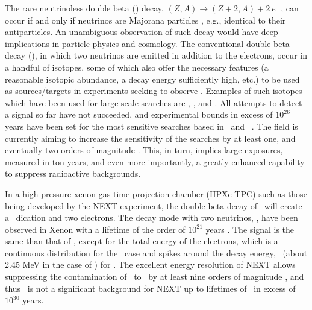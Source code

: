 \documentclass[aps,prl,reprint,longbibliography,superscriptaddress, english]{revtex4-1}
\begin{document}
The rare neutrinoless double beta  (\bbonu) decay, $(Z,A) \rightarrow (Z+2,A) + 2\ e^{-}$, can occur if and only if neutrinos are Majorana particles \cite{Majorana:1937}, e.g., identical to their antiparticles. An unambiguous observation of such decay would have deep implications in particle physics and cosmology\cite{Sakharov1967,Fukugita:1986hr, GellMann:1980vs, Yanagida:1979as, Mohapatra:1979ia}. 
The conventional double beta decay (\bbtnu), in which two neutrinos are emitted in addition to the electrons, occur in a handful of isotopes, some of which also offer the necessary features (a reasonable isotopic abundance, a decay energy sufficiently high, etc.) to be used as sources/targets in experiments seeking to observe \bbonu. Examples of such isotopes which have been used for large-scale searches are \GE, \TE, and \XE. All attempts to detect a signal so far have not succeeded, and experimental bounds in excess of $10^{26}$ years have been set for the most sensitive searches based in \XE\ and \GE\ \cite{Gando:2016ji, Agostini:2018tnm}.
The field is currently aiming to increase the sensitivity of the searches by at least one, and eventually two orders of magnitude \cite{Gomez-Cadenas:2019sfa}. This, in turn, implies large exposures, measured in ton-years, and even more importantly, a greatly enhanced capability to suppress radioactive backgrounds. 

In a high pressure xenon gas time projection chamber (HPXe-TPC) such as those being developed by the NEXT experiment, the double beta decay of \XE\ will create a \Bapp\ dication and two electrons.
%
The decay mode with two neutrinos, \bbtnu, have been observed in Xenon with a lifetime of the order of $10^{21}$ years \cite{Ackerman:2011gz}. The  signal is the same than that of \bbonu, except for the total energy of the electrons, which is a continuous distribution for the \bbtnu\ case and spikes around the decay energy, \Qbb\ (about 2.45 MeV in the case of \XE) for \bbonu. The excellent energy resolution of NEXT allows suppressing the contamination of \bbtnu\ to \bbonu\ by at least nine orders of magnitude \cite{rivilla_fluorescent_2020}, and thus \bbtnu\ is not a significant background for NEXT up to lifetimes of \bbonu\ in excess of $10^{30}$ years. 
\end{document}
